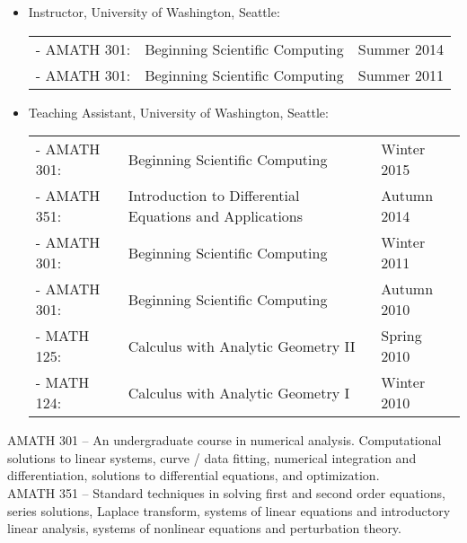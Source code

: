 \documentclass{article}
\begin{document}
\begin{itemize}
  \item Instructor, University of Washington, Seattle:

    \begin{tabular}{ p{2.25cm} p{10.5cm} p{2.25cm} }
      - AMATH 301: & Beginning Scientific Computing      & Summer 2014 \\
      - AMATH 301: & Beginning Scientific Computing      & Summer 2011 \\
    \end{tabular}

  \item Teaching Assistant, University of Washington, Seattle:

    \begin{tabular}{ p{2.25cm} p{10.5cm} p{2.25cm} }
      - AMATH 301: & Beginning Scientific Computing      & Winter 2015 \\
      - AMATH 351: & Introduction to Differential Equations and Applications
                   & Autumn 2014 \\
      - AMATH 301: & Beginning Scientific Computing      & Winter 2011 \\
      - AMATH 301: & Beginning Scientific Computing      & Autumn 2010 \\
      - MATH 125:  & Calculus with Analytic Geometry II  & Spring 2010 \\
      - MATH 124:  & Calculus with Analytic Geometry I   & Winter 2010 \\
    \end{tabular}
\end{itemize}

\noindent
AMATH 301 -- An undergraduate course in numerical
analysis. Computational solutions to linear systems, curve / data
fitting, numerical integration and differentiation, solutions to
differential equations, and optimization. \\

\noindent
AMATH 351 -- Standard techniques in solving first and second order
equations, series solutions, Laplace transform, systems of linear
equations and introductory linear analysis, systems of nonlinear
equations and perturbation theory.



\pagebreak



\end{document}
